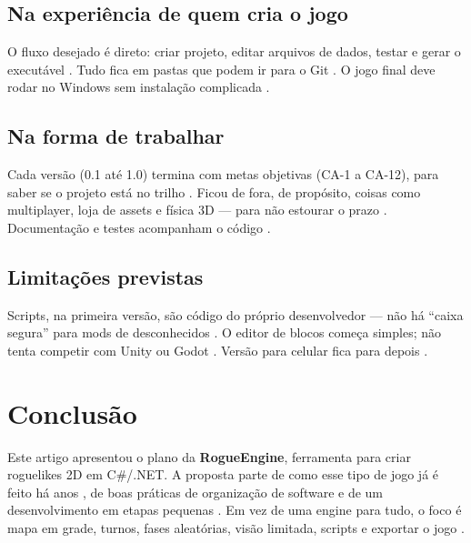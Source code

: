 \documentclass[12pt]{article}
\begin{document}
\subsection{Na experiência de quem cria o jogo}

O fluxo desejado é direto: criar projeto, editar arquivos de dados, testar e gerar o
executável \citep{adams2014,pressman2014,sommerville2015,unity2024,godot2024,lewis2014}. Tudo
fica em pastas que podem ir para o Git \citep{fowler2002,beck2001}. O jogo final deve rodar no
Windows sem instalação complicada \citep{netpublish2024,craddock2015,pinheiro2020}.

\subsection{Na forma de trabalhar}

Cada versão (0.1 até 1.0) termina com metas objetivas (CA-1 a CA-12), para saber se o projeto
está no trilho \citep{boehm1988,beck2001,sommerville2015,pressman2014}. Ficou de fora, de
propósito, coisas como multiplayer, loja de assets e física 3D --- para não estourar o prazo
\citep{lewis2014,wild2018}. Documentação e testes acompanham o código
\citep{martin2017,sommerville2015}.

\subsection{Limitações previstas}

Scripts, na primeira versão, são código do próprio desenvolvedor --- não há ``caixa segura''
para mods de desconhecidos \citep{gregory2018,roslyn2024,pressman2014,lewis2014}. O editor de
blocos começa simples; não tenta competir com Unity ou Godot \citep{repenning2017,unity2024,
adams2014}. Versão para celular fica para depois \citep{pressman2014}.

\section{Conclusão}

Este artigo apresentou o plano da \textbf{RogueEngine}, ferramenta para criar roguelikes 2D em
C\#/.NET. A proposta parte de como esse tipo de jogo já é feito há anos
\citep{berlin2008,dcss2023,wild2018}, de boas práticas de organização de software
\citep{gregory2018,nystrom2014,martin2017,sommerville2015,boehm1988,pressman2014} e de um
desenvolvimento em etapas pequenas \citep{beck2001}. Em vez de uma engine para tudo, o foco é
mapa em grade, turnos, fases aleatórias, visão limitada, scripts e exportar o jogo
\citep{hendrikx2013,unity2024,godot2024,lewis2014}.
\end{document}
